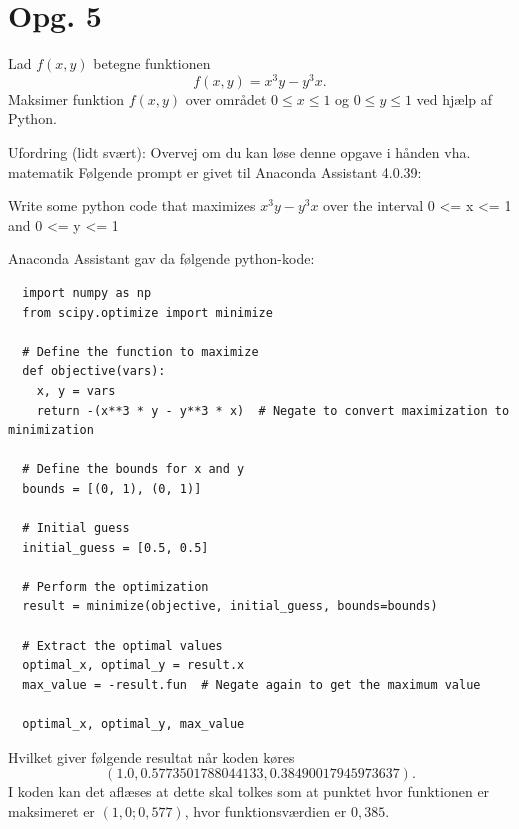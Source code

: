 \documentclass[12pt]{article}
\theoremstyle{definition}
\begin{document}
\section*{Opg. 5}
Lad $f(x,y)$ betegne funktionen
\[ 
f(x,y) = x^3y - y^3x
.\]
Maksimer funktion $f(x,y)$ over området $0 \leq x \leq 1$ og $0 \leq y \leq 1$ ved hjælp af Python.

Ufordring (lidt svært): Overvej om du kan løse denne opgave i hånden vha. matematik
\bigbreak
Følgende prompt er givet til Anaconda Assistant 4.0.39: 

\begin{blueline}
  Write some python code that maximizes $x^3y - y^3x$ over the interval 0 <= x <= 1 and 0 <= y <= 1
\end{blueline}

Anaconda Assistant gav da følgende python-kode:
\begin{verbatim}
  import numpy as np
  from scipy.optimize import minimize

  # Define the function to maximize
  def objective(vars):
    x, y = vars
    return -(x**3 * y - y**3 * x)  # Negate to convert maximization to minimization

  # Define the bounds for x and y
  bounds = [(0, 1), (0, 1)]

  # Initial guess
  initial_guess = [0.5, 0.5]

  # Perform the optimization
  result = minimize(objective, initial_guess, bounds=bounds)

  # Extract the optimal values
  optimal_x, optimal_y = result.x
  max_value = -result.fun  # Negate again to get the maximum value

  optimal_x, optimal_y, max_value
\end{verbatim}

Hvilket giver følgende resultat når koden køres
\[ 
  (1.0, 0.5773501788044133, 0.38490017945973637)
.\]
I koden kan det aflæses at dette skal tolkes som at punktet hvor funktionen er maksimeret er $(1,0; 0,577)$, hvor funktionsværdien er $0,385$.
\end{document}

